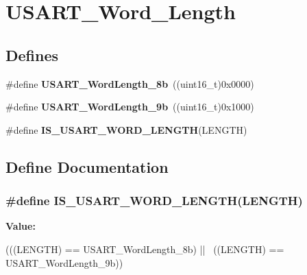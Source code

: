 \hypertarget{group__USART__Word__Length}{
\section{USART\_\-Word\_\-Length}
\label{group__USART__Word__Length}
}
\subsection*{Defines}
\begin{DoxyCompactItemize}
\item 
\hypertarget{group__USART__Word__Length_ga08682faddc657df85a93627b5a146c25}{
\#define {\bfseries USART\_\-WordLength\_\-8b}~((uint16\_\-t)0x0000)}
\label{group__USART__Word__Length_ga08682faddc657df85a93627b5a146c25}

\item 
\hypertarget{group__USART__Word__Length_gae7dd162142660e09e2321aa3f33dc4d2}{
\#define {\bfseries USART\_\-WordLength\_\-9b}~((uint16\_\-t)0x1000)}
\label{group__USART__Word__Length_gae7dd162142660e09e2321aa3f33dc4d2}

\item 
\#define {\bfseries IS\_\-USART\_\-WORD\_\-LENGTH}(LENGTH)
\end{DoxyCompactItemize}


\subsection{Define Documentation}
\hypertarget{group__USART__Word__Length_ga5b07b29ee91f0bea4c10ec0fd74fbc04}{
\subsubsection[{IS\_\-USART\_\-WORD\_\-LENGTH}]{\setlength{\rightskip}{0pt plus 5cm}\#define IS\_\-USART\_\-WORD\_\-LENGTH(LENGTH)}}
\label{group__USART__Word__Length_ga5b07b29ee91f0bea4c10ec0fd74fbc04}
{\bfseries Value:}
\begin{DoxyCode}
(((LENGTH) == USART_WordLength_8b) || \
                                      ((LENGTH) == USART_WordLength_9b))
\end{DoxyCode}

